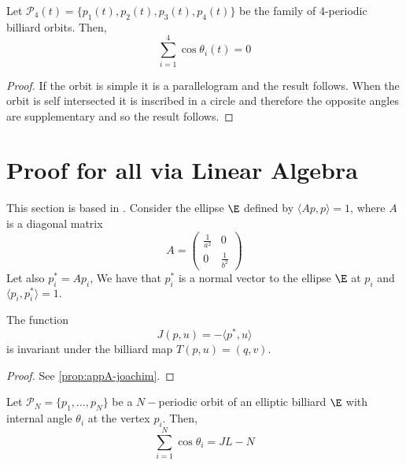 \begin{theorem}\label{thm:c4} Let $\mathcal{P}_4(t)=\{p_1(t),p_2(t),
p_3(t),p_4(t)\}$ 
be the family of 4-periodic billiard orbits.
Then,
\[\sum_{i=1}^4\cos \theta_i(t)=0\]
\label{th:soma_4cossenos}
\end{theorem}

\begin{proof}
If the orbit is simple it is a parallelogram and the result follows.
When the orbit is self intersected it is inscribed in a circle    and therefore the opposite angles are supplementary and so the result follows.
\end{proof}

\section{Proof for all  via Linear Algebra}
This section is based in   \cite{akopyan2020-invariants}.
Consider the ellipse $\E$ defined by $\langle Ap,p\rangle=1$, 
where $A$ is a diagonal matrix 
\[A=\left(\begin{matrix} \frac{1}{a^2} &0\\
0&\frac{1}{b^2}\end{matrix}\right)\]
Let also $p_i^*=Ap_i$, 
We have that $p_i^*$ is a normal vector to the ellipse $\E$ at $p_i$ and $\langle p_i,p_i^*\rangle=1.$
\begin{proposition}
The function
\[ J(p,u)=-\langle p^*,u\rangle\]
is invariant under the billiard map $T(p,u)=(q,v).$
\end{proposition}

 
\begin{proof}
See \cref{prop:appA-joachim}.
\end{proof}

\begin{theorem} \label{th:soma_cossenos} Let   $\mathcal{P}_N=\{p_1,\ldots, p_N\}$ be a $N-$periodic orbit of an elliptic billiard $\E$ with internal angle $\theta_i$ at the vertex $p_i$. Then,
\[\sum_{i=1}^{N}\cos\theta_i=JL-N\]
\end{theorem}


